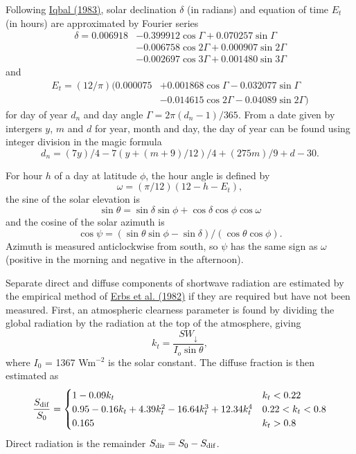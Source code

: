 \documentclass{article}
\begin{document}
Following \href{https://www.elsevier.com/books/an-introduction-to-solar-radiation/iqbal/978-0-12-373750-2}{Iqbal (1983)}, solar declination $\delta$ (in radians) and equation of time $E_t$ (in hours) are approximated by Fourier series
\begin{align}
\delta = 0.006918 &- 0.399912\cos\Gamma  + 0.070257\sin\Gamma  \nonumber \\
                  &- 0.006758\cos2\Gamma + 0.000907\sin2\Gamma \nonumber \\
                  &- 0.002697\cos3\Gamma + 0.001480\sin3\Gamma
\end{align}
and
\begin{align}
E_t = (12/\pi)(0.000075 &+ 0.001868\cos\Gamma  - 0.032077\sin\Gamma \nonumber \\
                        &- 0.014615\cos2\Gamma - 0.04089\sin2\Gamma)
\end{align}
for day of year $d_n$ and day angle $\Gamma = 2\pi(d_n - 1)/365$. From a date given by intergers $y$, $m$ and $d$ for year, month and day, the day of year can be found using integer division in the magic formula
\begin{equation}
d_n = (7y)/4 - 7(y+(m+9)/12)/4 + (275m)/9 + d - 30.
\end{equation}

For hour $h$ of a day at latitude $\phi$, the hour angle is defined by
\begin{equation}
\omega = (\pi/12)(12 - h - E_t),
\end{equation}
the sine of the solar elevation is
\begin{equation}
\sin\theta = \sin\delta\sin\phi + \cos\delta\cos\phi\cos\omega
\end{equation}
and the cosine of the solar azimuth is
\begin{equation}
\cos\psi = (\sin\theta\sin\phi - \sin\delta)/(\cos\theta\cos\phi).
\end{equation}
Azimuth is measured anticlockwise from south, so $\psi$ has the same sign as $\omega$ (positive in the morning and negative in the afternoon).

Separate direct and diffuse components of shortwave radiation are estimated by the empirical method of \href{https://www.sciencedirect.com/science/article/pii/0038092X82903024}{Erbs et al. (1982)} if they are required but have not been measured. First, an atmospheric clearness parameter is found by dividing the global radiation by the radiation at the top of the atmosphere, giving
\begin{equation}
k_t = \frac{SW_\downarrow}{I_o\sin\theta},
\end{equation}
where $I_0$ = 1367 Wm$^{-2}$ is the solar constant. The diffuse fraction is then estimated as
\begin{equation}
\frac{S_{\rm dif}}{S_0} = \begin{cases}
    1 - 0.09k_t &  k_t<0.22  \\
    0.95-0.16k_t+4.39k_t^2-16.64k_t^3+12.34k_t^4 &  0.22<k_t<0.8  \\
    0.165 &  k_t>0.8
\end{cases}
\end{equation}
Direct radiation is the remainder $S_{\rm dir} = S_0 - S_{\rm dif}$.
\end{document}
